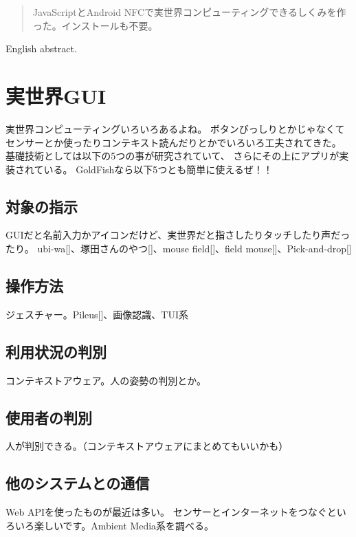 
\begin{abstract}
JavaScriptとAndroid NFCで実世界コンピューティングできるしくみを作った。インストールも不要。
\end{abstract}

\begin{eabstract}
English abstract.
\end{eabstract}

\maketitle

\section{実世界GUI}\label{sec:Introduction}

実世界コンピューティングいろいろあるよね。
ボタンびっしりとかじゃなくてセンサーとか使ったりコンテキスト読んだりとかでいろいろ工夫されてきた。
基礎技術としては以下の5つの事が研究されていて、
さらにその上にアプリが実装されている。
GoldFishなら以下5つとも簡単に使えるぜ！！


\subsection{対象の指示}
GUIだと名前入力かアイコンだけど、実世界だと指さしたりタッチしたり声だったり。
ubi-wa[]、塚田さんのやつ[]、mouse field[]、field mouse[]、Pick-and-drop[]

\subsection{操作方法}
ジェスチャー。Pileus[]、画像認識、TUI系

\subsection{利用状況の判別}
コンテキストアウェア。人の姿勢の判別とか。

\subsection{使用者の判別}
人が判別できる。（コンテキストアウェアにまとめてもいいかも）

\subsection{他のシステムとの通信}
Web APIを使ったものが最近は多い。
センサーとインターネットをつなぐといろいろ楽しいです。Ambient Media系を調べる。

